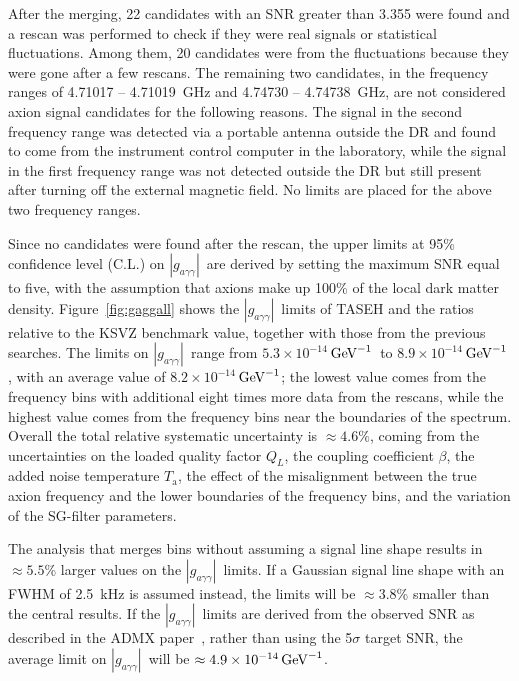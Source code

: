 \documentclass[%
 reprint,prl, %
superscriptaddress,
nobibnotes,
 amsmath,amssymb,
 aps,
]{revtex4-2}
\newcommand{\gagg}{\ensuremath{\left|g_{a\gamma\gamma}\right|}}
\newcommand{\ta}{\ensuremath{T_\text{a}}}
\newcommand{\GeVinv}{\ensuremath{\,\text{Ge\hspace{-.08em}V}^{-1}}}
\newcommand{\avelimit}{\ensuremath{8.2\times 10^{-14}}} %
\newcommand{\ADMXavelimit}{\ensuremath{4.9\times 10^{-14}}}
\newcommand{\lolimit}{\ensuremath{5.3\times 10^{-14}}}
\newcommand{\hilimit}{\ensuremath{8.9\times 10^{-14}}}
\begin{document}
After the merging, 22 candidates with an SNR greater than 3.355 were found and 
a rescan was performed to check if they were real signals  
or statistical fluctuations.        
Among them, 20 candidates were from the fluctuations because they were gone 
after a few rescans. 
The remaining two candidates, in the frequency ranges of 
4.71017 -- 4.71019~GHz and 4.74730 -- 4.74738~GHz, are not 
considered axion signal candidates for the following reasons. 
The signal in the second frequency range was detected via a portable antenna 
outside the DR and found 
to come from the instrument control computer in the laboratory, while the 
signal in the first frequency range was not 
detected outside the DR but still present after 
turning off the external magnetic field. 
No limits are placed for the above two frequency ranges.  

Since no candidates were found after the rescan, the upper limits 
at 95\% confidence level (C.L.) on \gagg\ are derived by setting the 
maximum SNR equal to five, 
with the assumption that axions make up 100\% of the local dark matter 
density.  
Figure~\ref{fig:gaggall} shows the \gagg\ limits of TASEH and the 
ratios relative to the KSVZ benchmark value,  
 together with those from the previous searches. 
The limits on 
\gagg\ range from \lolimit\GeVinv\ to \hilimit\GeVinv, with an average 
value of \avelimit\GeVinv; the lowest value comes from the frequency bins with 
additional eight times more data from the rescans, while the highest value 
comes from the frequency bins near the boundaries of the spectrum. 
Overall the total relative systematic uncertainty is 
$\approx 4.6\%$, coming from the uncertainties on the loaded quality 
factor $Q_L$, the coupling coefficient $\beta$, the added noise temperature 
\ta, the effect of the misalignment between the true axion frequency and 
the lower boundaries of the frequency bins, and the variation of the 
SG-filter parameters. 


The analysis that merges bins without 
assuming a signal line shape results in $\approx5.5$\% larger values on the 
\gagg\ limits. If a Gaussian signal line shape with an FWHM of 2.5~kHz  
 is assumed instead, the limits will be $\approx3.8$\% smaller than the 
central results. If the \gagg\ limits are derived from the observed SNR as 
described in the ADMX paper~\cite{ADMXVIII}, 
rather than using the 5$\sigma$ target SNR, the average limit on \gagg\ will 
be $\approx\ADMXavelimit\GeVinv$. 
\end{document}
